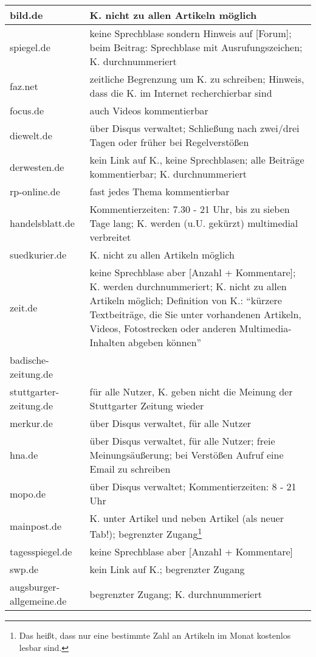 \begin{landscape}
\begin{longtable}{lp{170mm}}
bild.de			& K. nicht zu allen Artikeln möglich \\\hline
spiegel.de		  	& keine Sprechblase sondern Hinweis auf [Forum]; beim Beitrag: Sprechblase mit Ausrufungszeichen; K. durchnummeriert \\\hline
faz.net			& zeitliche Begrenzung um K. zu schreiben; Hinweis, dass die K. im Internet recherchierbar sind\\\hline
focus.de			& auch Videos kommentierbar \\\hline
diewelt.de			& über Disqus verwaltet; Schließung nach zwei/drei Tagen oder früher bei Regelverstößen \\\hline
derwesten.de		& kein Link auf K., keine Sprechblasen; alle Beiträge kommentierbar; K. durchnummeriert \\\hline
rp-online.de		& fast jedes Thema kommentierbar \\\hline
handelsblatt.de		& Kommentierzeiten: 7.30 - 21 Uhr, bis zu sieben Tage lang; K. werden (u.U. gekürzt) multimedial verbreitet \\\hline
suedkurier.de		& K. nicht zu allen Artikeln möglich \\\hline
zeit.de			& keine Sprechblase aber [Anzahl + Kommentare]; K. werden durchnummeriert;  K. nicht zu allen Artikeln möglich; Definition von K.: ``kürzere Textbeiträge, die Sie unter vorhandenen Artikeln, Videos, Fotostrecken oder anderen Multimedia-Inhalten abgeben können'' \\\hline
badische-zeitung.de	& \\\hline
stuttgarter-zeitung.de	& für alle Nutzer, K. geben nicht die Meinung der Stuttgarter Zeitung wieder\\\hline
merkur.de			& über Disqus verwaltet, für alle Nutzer\\\hline
hna.de			& über Disqus verwaltet, für alle Nutzer; freie Meinungsäußerung; bei Verstößen Aufruf eine Email zu schreiben \\\hline
mopo.de			& über Disqus verwaltet; Kommentierzeiten: 8 - 21 Uhr\\\hline
mainpost.de		& K. unter Artikel und neben Artikel (als neuer Tab!); begrenzter Zugang\footnote{Das heißt, dass nur eine bestimmte Zahl an Artikeln im Monat kostenlos lesbar sind.}\\\hline
tagesspiegel.de		& keine Sprechblase aber [Anzahl + Kommentare]\\\hline
swp.de			& kein Link auf K.; begrenzter Zugang\\\hline
augsburger-allgemeine.de	& begrenzter Zugang; K. durchnummeriert

\end{longtable}
\end{landscape}


